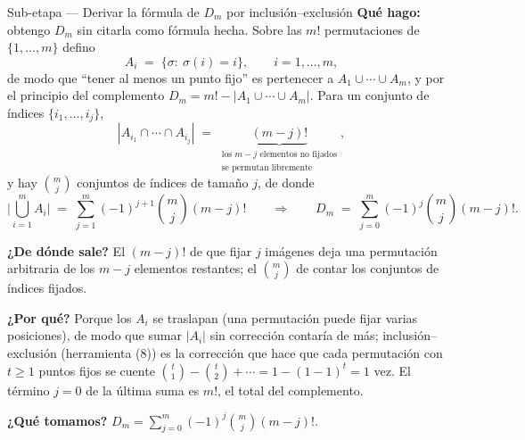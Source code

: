 \documentclass[11pt]{article}
\begin{document}
\begin{paso}{Sub-etapa --- Derivar la f\'ormula de $D_m$ por inclusi\'on--exclusi\'on}
\textbf{Qu\'e hago:} obtengo $D_m$ sin citarla como f\'ormula hecha. Sobre las $m!$ permutaciones de
$\{1,\dots,m\}$ defino
\[
A_i\;=\;\{\sigma:\ \sigma(i)=i\},\qquad i=1,\dots,m ,
\]
de modo que ``tener al menos un punto fijo'' es pertenecer a $A_1\cup\cdots\cup A_m$, y por el principio del
complemento $D_m=m!-|A_1\cup\cdots\cup A_m|$. Para un conjunto de \'indices $\{i_1,\dots,i_j\}$,
\[
|A_{i_1}\cap\cdots\cap A_{i_j}|\;=\;\underbrace{(m-j)!}_{\substack{\text{los }m-j\text{ elementos no fijados}\\ \text{se permutan libremente}}} ,
\]
y hay $\binom{m}{j}$ conjuntos de \'indices de tama\~no $j$, de donde
\[
\Big|\bigcup_{i=1}^{m}A_i\Big|\;=\;\sum_{j=1}^{m}(-1)^{j+1}\binom{m}{j}(m-j)!
\qquad\Longrightarrow\qquad
D_m\;=\;\sum_{j=0}^{m}(-1)^{j}\binom{m}{j}(m-j)! .
\]

\textbf{¿De d\'onde sale?} El $(m-j)!$ de que fijar $j$ im\'agenes deja una permutaci\'on arbitraria de los
$m-j$ elementos restantes; el $\binom{m}{j}$ de contar los conjuntos de \'indices fijados.

\textbf{¿Por qu\'e?} Porque los $A_i$ se traslapan (una permutaci\'on puede fijar varias posiciones), de modo
que sumar $|A_i|$ sin correcci\'on contar\'ia de m\'as; inclusi\'on--exclusi\'on (herramienta (8)) es la
correcci\'on que hace que cada permutaci\'on con $t\ge 1$ puntos fijos se cuente
$\binom{t}{1}-\binom{t}{2}+\cdots=1-(1-1)^t=1$ vez. El t\'ermino $j=0$ de la \'ultima suma es $m!$, el total
del complemento.

\textbf{¿Qu\'e tomamos?} $D_m=\sum_{j=0}^{m}(-1)^{j}\binom{m}{j}(m-j)!$.
\end{paso}
\end{document}
